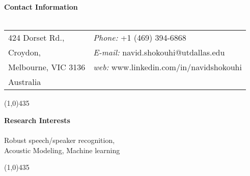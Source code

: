 
\newenvironment{list1}{
	\begin{list}{\ding{113}}{%
			\setlength{\itemsep}{0in}
			\setlength{\parsep}{0in} \setlength{\parskip}{0in}
			\setlength{\topsep}{0in} \setlength{\partopsep}{0in} 
			\setlength{\leftmargin}{0.17in}}}{\end{list}}
\newenvironment{list2}{
	\begin{list}{$\bullet$}{%
			\setlength{\itemsep}{0in}
			\setlength{\parsep}{0in} \setlength{\parskip}{0in}
			\setlength{\topsep}{0in} \setlength{\partopsep}{0in} 
			\setlength{\leftmargin}{0.2in}}}{\end{list}}


	\textbf{\sc Contact Information\\\\}
	\begin{tabular}{@{}p{2.25in}p{4in}}
		424 Dorset Rd., &    {\it Phone:} +1 (469) 394-6868\\        
		Croydon, &  {\it E-mail:}  navid.shokouhi@utdallas.edu\\     
		Melbourne, VIC 3136  &  {\it web:} www.linkedin.com/in/navidshokouhi\\         
		Australia &  
		
	\end{tabular}
	
	\line(1,0){435}
	
	
	\vspace{0mm}
	\textbf{\sc Research Interests\\\\}
	Robust speech/speaker recognition, \\
	Acoustic Modeling, Machine learning
	
	\line(1,0){435}
	
